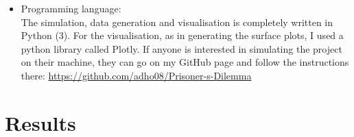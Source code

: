 \documentclass{article}
\begin{document}
\begin{itemize}
	\item Programming language:\\

The simulation, data generation and visualisation is completely written in Python (3).
For the visualisation, as in generating the surface plots, I used a python library called Plotly.
If anyone is interested in simulating the project on their machine, they can go on my GitHub page and follow the instructions there:
\href{https://github.com/adho08/Prisoner-s-Dilemma}{https://github.com/adho08/Prisoner-s-Dilemma}

	
\end{itemize}

\section{Results}
\end{document}
